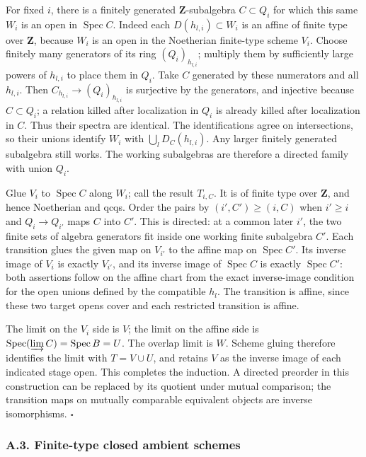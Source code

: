 \documentclass[11pt]{article}
\begin{document}
For fixed \(i\), there is a finitely generated \(\mathbf Z\)-subalgebra
\(C\subset Q_i\) for which this same \(W_i\) is an open in
\(\operatorname{Spec}C\). Indeed each \(D(h_{l,i})\subset W_i\) is an
affine of finite type over \(\mathbf Z\), because \(W_i\) is an open in
the Noetherian finite-type scheme \(V_i\). Choose finitely many
generators of its ring \((Q_i)_{h_{l,i}}\); multiply them by
sufficiently large powers of \(h_{l,i}\) to place them in \(Q_i\). Take
\(C\) generated by these numerators and all \(h_{l,i}\). Then
\(C_{h_{l,i}}\to(Q_i)_{h_{l,i}}\) is surjective by the generators, and
injective because \(C\subset Q_i\); a relation killed after localization
in \(Q_i\) is already killed after localization in \(C\). Thus their
spectra are identical. The identifications agree on intersections, so
their unions identify \(W_i\) with \(\bigcup_lD_C(h_{l,i})\). Any larger
finitely generated subalgebra still works. The working subalgebras are
therefore a directed family with union \(Q_i\).

Glue \(V_i\) to \(\operatorname{Spec}C\) along \(W_i\); call the result
\(T_{i,C}\). It is of finite type over \(\mathbf Z\), and hence
Noetherian and qcqs. Order the pairs by \((i',C')\ge(i,C)\) when
\(i'\ge i\) and \(Q_i\to Q_{i'}\) maps \(C\) into \(C'\). This is
directed: at a common later \(i'\), the two finite sets of algebra
generators fit inside one working finite subalgebra \(C'\). Each
transition glues the given map on \(V_{i'}\) to the affine map on
\(\operatorname{Spec}C'\). Its inverse image of \(V_i\) is exactly
\(V_{i'}\), and its inverse image of \(\operatorname{Spec}C\) is exactly
\(\operatorname{Spec}C'\): both assertions follow on the affine chart
from the exact inverse-image condition for the open unions defined by
the compatible \(h_l\). The transition is affine, since these two target
opens cover and each restricted transition is affine.

The limit on the \(V_i\) side is \(V\); the limit on the affine side is
\(\operatorname{Spec}(\varinjlim C)=\operatorname{Spec}B=U\). The
overlap limit is \(W\). Scheme gluing therefore identifies the limit
with \(T=V\cup U\), and retains \(V\) as the inverse image of each
indicated stage open. This completes the induction. A directed preorder
in this construction can be replaced by its quotient under mutual
comparison; the transition maps on mutually comparable equivalent
objects are inverse isomorphisms. \(\square\)

\subsubsection{A.3. Finite-type closed ambient
schemes}\label{a.3.-finite-type-closed-ambient-schemes}
\end{document}
